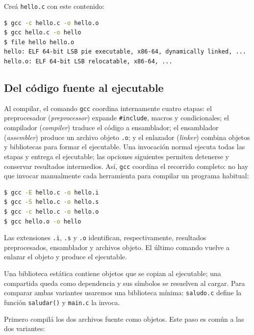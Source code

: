 \documentclass[11pt,a4paper]{article}
\newcommand{\inputcode}[2][]{%
  \par\addvspace{0.2\baselineskip}\noindent
  \begin{minipage}{\linewidth}
    
  \end{minipage}\par\addvspace{0.2\baselineskip}}
\begin{document}
Creá \texttt{hello.c} con este contenido:

\inputcode[language=C]{../examples/tp3/hello.c}

\begin{lstlisting}[language=bash]
$ gcc -c hello.c -o hello.o
$ gcc hello.c -o hello
$ file hello hello.o
hello: ELF 64-bit LSB pie executable, x86-64, dynamically linked, ...
hello.o: ELF 64-bit LSB relocatable, x86-64, ...
\end{lstlisting}

\subsection{Del código fuente al ejecutable}

Al compilar, el comando \texttt{gcc} coordina internamente cuatro etapas: el
preprocesador (\emph{preprocessor}) expande \texttt{\#include}, macros y
condicionales; el compilador (\emph{compiler}) traduce el código a ensamblador;
el ensamblador (\emph{assembler}) produce un archivo objeto \texttt{.o}; y el
enlazador (\emph{linker}) combina objetos y bibliotecas para formar el
ejecutable. Una invocación normal ejecuta todas las etapas y entrega el
ejecutable; las opciones siguientes permiten detenerse y conservar resultados
intermedios. Así, \texttt{gcc} coordina el recorrido completo: no hay que
invocar manualmente cada herramienta para compilar un programa habitual:

\begin{lstlisting}[language=bash]
$ gcc -E hello.c -o hello.i
$ gcc -S hello.c -o hello.s
$ gcc -c hello.c -o hello.o
$ gcc hello.o -o hello
\end{lstlisting}

Las extensiones \texttt{.i}, \texttt{.s} y \texttt{.o} identifican,
respectivamente, resultados preprocesados, ensamblador y archivos objeto.
El último comando vuelve a enlazar el objeto y produce el ejecutable.

Una biblioteca estática contiene objetos que se copian al ejecutable; una
compartida queda como dependencia y sus símbolos se resuelven al cargar.
Para comparar ambas variantes usaremos una biblioteca mínima: \texttt{saludo.c}
define la función \texttt{saludar()} y \texttt{main.c} la invoca.

\inputcode[language=C]{../examples/tp3/shared/saludo.c}
\inputcode[language=C]{../examples/tp3/shared/main.c}

Primero compilá los dos archivos fuente como objetos. Este paso es común a las
dos variantes:
\end{document}
